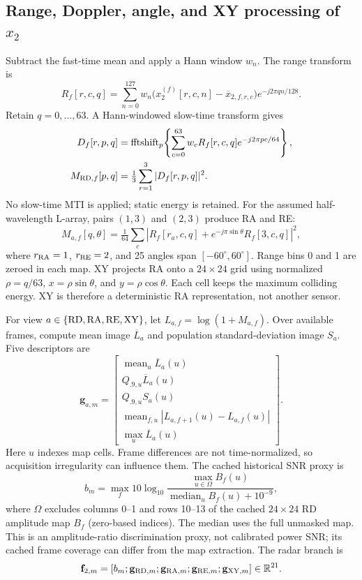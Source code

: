 \documentclass[conference,10pt,letterpaper]{IEEEtran}
\newcommand{\R}{\mathbb{R}}
\DeclareMathOperator{\med}{median}
\DeclareMathOperator{\mean}{mean}
\begin{document}
\subsection{Range, Doppler, angle, and XY processing of $x_2$}
Subtract the fast-time mean and apply a Hann window $w_n$. The range transform is
\begin{equation}
R_f[r,c,q]=\sum_{n=0}^{127}w_n\big(x_2^{(f)}[r,c,n]-\overline{x}_{2,f,r,c}\big)e^{-j2\pi qn/128}.
\end{equation}
Retain $q=0,\ldots,63$. A Hann-windowed slow-time transform gives
\begin{align}
D_f[r,p,q]&=\operatorname{fftshift}_p\!\left\{\sum_{c=0}^{63}w_cR_f[r,c,q]e^{-j2\pi pc/64}\right\},\\
M_{{\rm RD},f}[p,q]&=\tfrac13\sum_{r=1}^3|D_f[r,p,q]|^2.\label{eq:rd}
\end{align}
No slow-time MTI is applied; static energy is retained. For the assumed half-wavelength L-array, pairs $(1,3)$ and $(2,3)$ produce RA and RE:
\begin{equation}
M_{a,f}[q,\theta]=\tfrac1{64}\sum_c
\left|R_f[r_a,c,q]+e^{-j\pi\sin\theta}R_f[3,c,q]\right|^2,
\end{equation}
where $r_{\rm RA}=1$, $r_{\rm RE}=2$, and 25 angles span $[-60^\circ,60^\circ]$. Range bins 0 and 1 are zeroed in each map. XY projects RA onto a $24\times24$ grid using normalized $\rho=q/63$, $x=\rho\sin\theta$, and $y=\rho\cos\theta$. Each cell keeps the maximum colliding energy. XY is therefore a deterministic RA representation, not another sensor.

For view $a\in\{{\rm RD,RA,RE,XY}\}$, let $L_{a,f}=\log(1+M_{a,f})$. Over available frames, compute mean image $\overline L_a$ and population standard-deviation image $S_a$. Five descriptors are
\begin{equation}
\mathbf g_{a,m}=\begin{bmatrix}
\mean_u\overline L_a(u)\\Q_{.9,u}\overline L_a(u)\\
Q_{.9,u}S_a(u)\\\mean_{f,u}|L_{a,f+1}(u)-L_{a,f}(u)|\\
\max_u\overline L_a(u)
\end{bmatrix}.\label{eq:pool}
\end{equation}
Here $u$ indexes map cells. Frame differences are not time-normalized, so acquisition irregularity can influence them. The cached historical SNR proxy is
\begin{equation}
b_m=\max_f10\log_{10}\!\frac{\max_{u\in\Omega}B_f(u)}{\med_u B_f(u)+10^{-9}},
\end{equation}
where $\Omega$ excludes columns 0--1 and rows 10--13 of the cached $24\times24$ RD amplitude map $B_f$ (zero-based indices). The median uses the full unmasked map. This is an amplitude-ratio discrimination proxy, not calibrated power SNR; its cached frame coverage can differ from the map extraction. The radar branch is
\begin{equation}
\mathbf f_{2,m}=[b_m;\mathbf g_{{\rm RD},m};\mathbf g_{{\rm RA},m};
\mathbf g_{{\rm RE},m};\mathbf g_{{\rm XY},m}]\in\R^{21}.
\end{equation}
\end{document}
